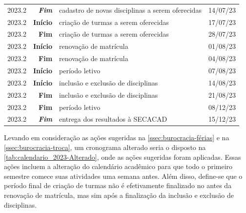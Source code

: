 \begin{table}[H]
\begin{tabular}{| c r l c |}
    2023.2            & \textbf{\textit{Fim}} & cadastro de novas disciplinas a serem oferecidas & 14/07/23      \\
    2023.2            & \textbf{Início}       & criação de turmas a serem oferecidas             & 17/07/23      \\
    2023.2            & \textbf{Fim}          & criação de turmas a serem oferecidas             & 28/07/23      \\
    2023.2            & \textbf{Início}       & renovação de matrícula                           & 01/08/23      \\
    2023.2            & \textbf{Fim}          & renovação de matrícula                           & 04/08/23      \\
    2023.2            & \textbf{Início}       & período letivo                                   & 07/08/23      \\
    2023.2            & \textbf{Início}       & inclusão e exclusão de disciplinas               & 14/08/23      \\
    2023.2            & \textbf{Fim}          & inclusão e exclusão de disciplinas               & 21/08/23      \\
    2023.2            & \textbf{Fim}          & período letivo                                   & 08/12/23      \\
    2023.2            & \textbf{\textit{Fim}} & entrega dos resultados à SECACAD                 & 15/12/23      \\

    \hline
  \end{tabular}
\end{table}

Levando em consideração as ações sugeridas na \autoref{ssec:burocracia-férias} e na \autoref{ssec:burocracia-troca}, um cronograma alterado seria o disposto na \autoref{tab:calendario_2023-Alterado}, onde as ações sugeridas foram aplicadas. Essas ações incluem a alteração do calendário acadêmico para que todo o primeiro semestre comece suas atividades uma semana antes. Além disso, define-se que o período final de criação de turmas não é efetivamente finalizado no antes da renovação de matrícula, mas sim após a finalização da inclusão e exclusão de disciplinas.


